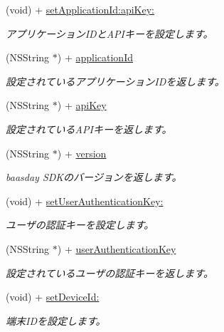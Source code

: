 \begin{DoxyCompactItemize}
\item 
(void) + \hyperlink{interface_b_d_baasday_a28ad1db2e5669fff9a863199558875d9}{set\-Application\-Id\-:api\-Key\-:}
\begin{DoxyCompactList}\small\item\em アプリケーション\-I\-Dと\-A\-P\-Iキーを設定します。 \end{DoxyCompactList}\item 
(N\-S\-String $\ast$) + \hyperlink{interface_b_d_baasday_a5197d512ac471736b3cd7504eab5e616}{application\-Id}
\begin{DoxyCompactList}\small\item\em 設定されているアプリケーション\-I\-Dを返します。 \end{DoxyCompactList}\item 
(N\-S\-String $\ast$) + \hyperlink{interface_b_d_baasday_a77957213ffb7cfacda2fa654052ed42d}{api\-Key}
\begin{DoxyCompactList}\small\item\em 設定されている\-A\-P\-Iキーを返します。 \end{DoxyCompactList}\item 
(N\-S\-String $\ast$) + \hyperlink{interface_b_d_baasday_aa438f9ac3201bed6a80d61b9266da2e2}{version}
\begin{DoxyCompactList}\small\item\em baasday S\-D\-Kのバージョンを返します。 \end{DoxyCompactList}\item 
(void) + \hyperlink{interface_b_d_baasday_a2945ce7e7204bdd06e8aab875867b0b5}{set\-User\-Authentication\-Key\-:}
\begin{DoxyCompactList}\small\item\em ユーザの認証キーを設定します。 \end{DoxyCompactList}\item 
(N\-S\-String $\ast$) + \hyperlink{interface_b_d_baasday_a3d8fec4aaacd7f75f373f6d516e52335}{user\-Authentication\-Key}
\begin{DoxyCompactList}\small\item\em 設定されているユーザの認証キーを返します。 \end{DoxyCompactList}\item 
(void) + \hyperlink{interface_b_d_baasday_a349f6418e86a43d0822552df10b77170}{set\-Device\-Id\-:}
\begin{DoxyCompactList}\small\item\em 端末\-I\-Dを設定します。 \end{DoxyCompactList}\item 

\end{DoxyCompactItemize}
